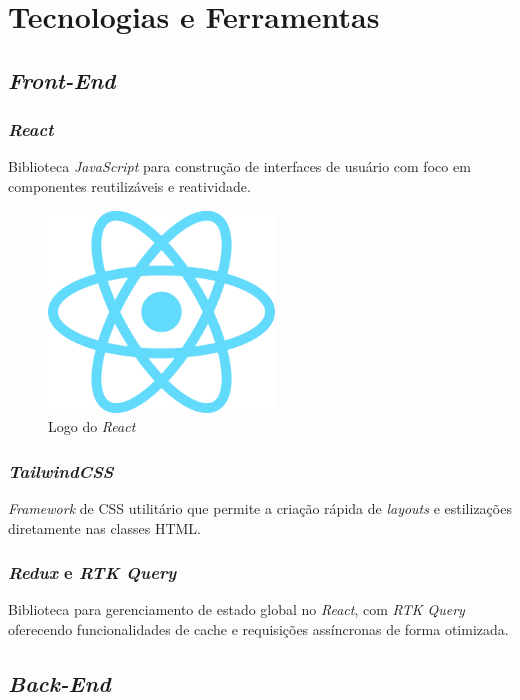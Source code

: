 \section{Tecnologias e Ferramentas} 

\subsection{\emph{Front-End}} 

\subsubsection{\emph{React}} 
Biblioteca \emph{JavaScript} para construção de interfaces de usuário com foco em componentes reutilizáveis e reatividade.

\begin{figure}[htb]
	\centering
	\includegraphics[width=6cm]{cap04-desenvolvimento/images/4-4-1-1-react}
	\caption{Logo do \emph{React}}
	\label{fig:logo_react}
\end{figure}


\subsubsection{\emph{TailwindCSS}} 
\emph{Framework} de CSS utilitário que permite a criação rápida de \emph{layouts} e estilizações diretamente nas classes HTML.

\subsubsection{\emph{Redux} e \emph{RTK Query}} 
Biblioteca para gerenciamento de estado global no \emph{React}, com \emph{RTK Query} oferecendo funcionalidades de cache e requisições assíncronas de forma otimizada.

\subsection{\emph{Back-End}} 

